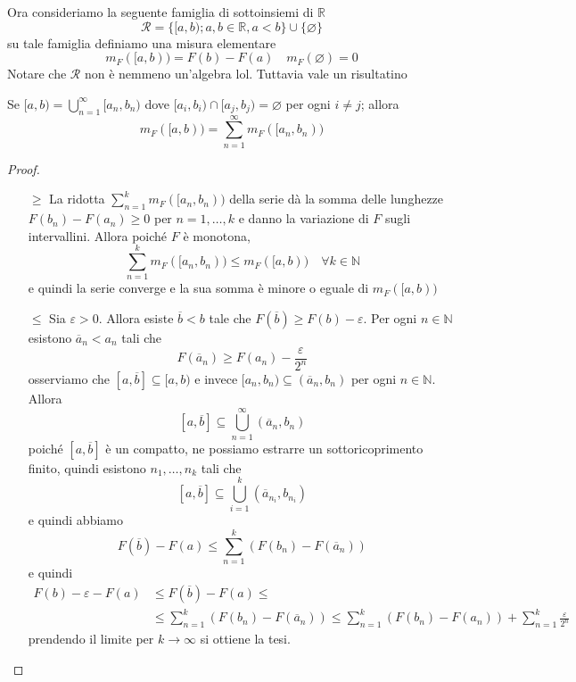 Ora consideriamo la seguente famiglia di sottoinsiemi di \(\mathbb{R}\) 
\[
    \mathcal{R} = \{[a, b); a, b \in  \mathbb{R}, a < b\} \cup \{\varnothing\} 
\]
su tale famiglia definiamo una misura elementare 
\[
    m_F{([a,b))} = F{(b)} - F{(a)} \quad m_F{(\varnothing)} = 0
\]
Notare che \(\mathcal{R}\) non è nemmeno un'algebra lol. Tuttavia vale un
risultatino
\begin{proposition}
    Se \([a, b) = \bigcup_{n=1}^{\infty}[a_{n}, b_{n})\) dove \([a_{i}, b_{i})
    \cap [a_{j}, b_{j}) = \varnothing\) per ogni \(i \neq j\); allora
    \[
        m_F{([a, b))} = \sum_{n=1}^{\infty} m_F{([a_{n}, b_{n}))}
    \]
\end{proposition}
\begin{proof} \( \) 
\begin{enumerate}[label = \arabic*.]
    \item[\(\ge \)] La ridotta \(\sum_{n=1}^{k} m_F{([a_{n}, b_{n}))} \) della
        serie dà la somma delle lunghezze \(F{(b_{n})} - F{(a_{n})} \ge 0\) per
        \(n=1,\dots,k\) e danno la variazione di \(F\) sugli intervallini.
        Allora poiché \(F\) è monotona, 
        \[
            \sum_{n=1}^{k} m_F{([a_{n}, b_{n}))} \le m_F{([a, b))} \quad \forall
            k \in \mathbb{N}
        \]
        e quindi la serie converge e la sua somma è minore o eguale di
        \(m_F{([a,b))}\) 
    \item[\(\le \)] Sia \(\varepsilon>0\). Allora esiste \(\overline{b} < b\)
        tale che \(F{(\overline{b})}\ge F{(b)}-\varepsilon\). Per ogni \(n \in
        \mathbb{N}\) esistono \(\overline{a}_n < a_{n}\) tali che 
        \[
          F{(\overline{a}_n)} \ge F{(a_{n})} - \frac{\varepsilon}{2^{n}}
        \]
        osserviamo che \([a, \overline{b}] \subseteq [a, b)\)  e invece \([a_{n},
        b_{n}) \subseteq (\overline{a}_{n}, b_{n}) \) per ogni \(n \in \mathbb{N}\). Allora
        \[
            [a, \overline{b}] \subseteq \bigcup_{n=1}^{\infty}(\overline{a}_{n}, b_{n})
        \]
        poiché \([a, \overline{b}]\) è un compatto, ne possiamo estrarre un
        sottoricoprimento finito, quindi esistono \(n_1, \dots, n_k\) tali che
        \[
            [a, \overline{b}] \subseteq \bigcup_{i=1}^{k}(\overline{a}_{n_i}, b_{n_i})
        \]
        e quindi abbiamo
        \[
          F{(\overline{b})} - F{(a)} \le  \sum_{n=1}^{k} {\left( F{(b_{n})} -
          F{(\overline{a}_n)} \right)}  
        \]
        e quindi
        \begin{align*}
            F{(b)} - \varepsilon - F{(a)} &\le F{(\overline{b})} - F{(a)} \le \\
            &\le 
          \sum_{n=1}^{k} {\left( F{(b_{n})} - F{(\overline{a}_n)} \right)} \le
          \sum_{n=1}^{k} {\left( F{(b_{n})} - F{(a_{n})} \right)} +
          \sum_{n=1}^{k} \frac{\varepsilon}{2^{n}}
        \end{align*}
        prendendo il limite per \(k \rightarrow \infty\) si ottiene la tesi. 
\end{enumerate}
\end{proof}
